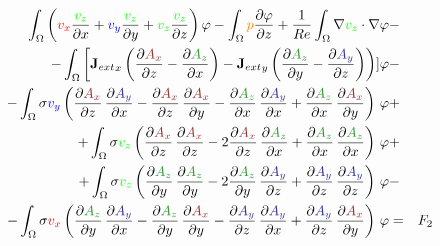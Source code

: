 \documentclass[smallextended]{svjour3}       %
\begin{document}
\begin{eqnarray}
			\int_{\Omega} \left(\textcolor{red}{v_x} \frac{\textcolor{gre}{v_z}}{\partial x} + \textcolor{blu}{v_y} \frac{\textcolor{gre}{v_z}}{\partial y} + \textcolor{gre}{v_z} \frac{\textcolor{gre}{v_z}}{\partial z}\right) \varphi
			- \int_{\Omega} \textcolor{orange}{p} \frac{\partial \varphi}{\partial z}
			+ \frac{1}{Re} \int_{\Omega} \nabla \textcolor{gre}{v_z} \cdot \nabla \varphi \nonumber & -\\
			- \int_{\Omega} \left[{\mathbf{J}_{ext}}_x \left(\frac{\partial \textcolor{darkred}{A_x}}{\partial z} - \frac{\partial \textcolor{darkgre}{A_z}}{\partial x}\right) - {\mathbf{J}_{ext}}_y \left(\frac{\partial \textcolor{darkgre}{A_z}}{\partial y} - \frac{\partial \textcolor{darkblu}{A_y}}{\partial z}\right)\right)] \varphi			
			\nonumber & -\\			- \int_{\Omega} \sigma \textcolor{blu}{v_y} \left(\frac{\partial \textcolor{darkred}{A_x}}{\partial z}\,\frac{\partial \textcolor{darkblu}{A_y}}{\partial x} - \frac{\partial \textcolor{darkred}{A_x}}{\partial z}\,\frac{\partial \textcolor{darkred}{A_x}}{\partial y} - \frac{\partial \textcolor{darkgre}{A_z}}{\partial x}\,\frac{\partial \textcolor{darkblu}{A_y}}{\partial x}  + \frac{\partial \textcolor{darkgre}{A_z}}{\partial x}\,\frac{\partial \textcolor{darkred}{A_x}}{\partial y} \right)\, \varphi& +\nonumber \\			
			+ \int_{\Omega} \sigma \textcolor{gre}{v_z} \left(\frac{\partial \textcolor{darkred}{A_x}}{\partial z}\,\frac{\partial \textcolor{darkred}{A_x}}{\partial z} - 2 \frac{\partial \textcolor{darkred}{A_x}}{\partial z}\,\frac{\partial \textcolor{darkgre}{A_z}}{\partial x} + \frac{\partial \textcolor{darkgre}{A_z}}{\partial x}\,\frac{\partial \textcolor{darkgre}{A_z}}{\partial x} \right)\, \varphi& +\nonumber \\			
			+ \int_{\Omega} \sigma \textcolor{gre}{v_z} \left(\frac{\partial \textcolor{darkgre}{A_z}}{\partial y}\,\frac{\partial \textcolor{darkgre}{A_z}}{\partial y} - 2 \frac{\partial \textcolor{darkgre}{A_z}}{\partial y}\,\frac{\partial \textcolor{darkblu}{A_y}}{\partial z} + \frac{\partial \textcolor{darkblu}{A_y}}{\partial z}\,\frac{\partial \textcolor{darkblu}{A_y}}{\partial z} \right)\, \varphi& -\nonumber \\			
			- \int_{\Omega} \sigma \textcolor{red}{v_x} \left(\frac{\partial \textcolor{darkgre}{A_z}}{\partial y}\,\frac{\partial \textcolor{darkblu}{A_y}}{\partial x} - \frac{\partial \textcolor{darkgre}{A_z}}{\partial y}\,\frac{\partial \textcolor{darkred}{A_x}}{\partial y} - \frac{\partial \textcolor{darkblu}{A_y}}{\partial z}\,\frac{\partial \textcolor{darkblu}{A_y}}{\partial x} + \frac{\partial \textcolor{darkblu}{A_y}}{\partial z}\,\frac{\partial \textcolor{darkred}{A_x}}{\partial y} \right)\, \varphi& = & F_2\\				

\end{eqnarray}
\end{document}
